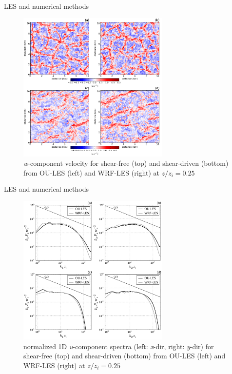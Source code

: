 
\begin{frame}{LES and numerical methods}

\begin{figure}
	\includegraphics[width=0.67\textwidth]{gibbs2}
	\caption{\scriptsize \textit{w}-component velocity for shear-free (top) and shear-driven (bottom) from OU-LES (left) and WRF-LES (right) at $z/z_i=0.25$}
\end{figure}

\end{frame}


\begin{frame}{LES and numerical methods}

\begin{figure}
	\includegraphics[width=0.67\textwidth]{gibbs3}
	\caption{\scriptsize normalized 1D \textit{u}-component spectra (left: \textit{x}-dir, right: \textit{y}-dir) for shear-free (top) and shear-driven (bottom) from OU-LES (left) and WRF-LES (right) at $z/z_i=0.25$}
\end{figure}

\end{frame}


